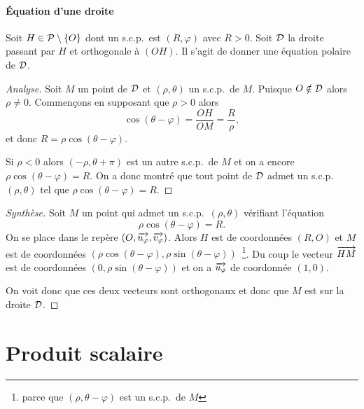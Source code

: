 \paragraph{Équation d'une droite}
\label{par:eqdroite}
Soit $H \in \P\setminus\{O\}$ dont un s.c.p.\ est $(R,\varphi)$ avec $R>0$. Soit $\Dr$ la droite passant par $H$ et orthogonale à $(OH)$. Il s'agit de donner une équation polaire de $\Dr$.
\begin{proof}[Analyse]
  Soit $M$ un point de $\Dr$ et $(\rho,\theta)$ un s.c.p.\ de $M$. Puisque $O \notin \Dr$ alors $\rho \neq 0$. Commençons en supposant que $\rho>0$ alors
  \begin{equation}
    \cos(\theta-\varphi)=\frac{OH}{OM}=\frac{R}{\rho},
  \end{equation}
  et donc $R=\rho \cos(\theta-\varphi)$. 

  Si $\rho<0$ alors $(-\rho,\theta+\pi)$ est un autre s.c.p.\ de $M$ et on a encore $\rho\cos(\theta-\varphi)=R$. On a donc montré que tout point de $\Dr$ admet un s.c.p.\ $(\rho, \theta)$ tel que $\rho\cos(\theta-\varphi)=R$.
\end{proof}
\begin{proof}[Synthèse]
Soit $M$ un point qui admet un s.c.p.\ $(\rho,\theta)$ vérifiant l'équation
\begin{equation}
  \rho\cos(\theta-\varphi)=R.
\end{equation}
On se place dans le repère $(O,\vect{u_\varphi}, \vect{v_\varphi})$. Alors $H$ est de coordonnées $(R,O)$ et $M$ est de coordonnées $(\rho\cos(\theta-\varphi), \rho\sin(\theta-\varphi))$~\footnote{parce que $(\rho, \theta-\varphi)$ est un s.c.p.\ de $M$}. Du coup le vecteur $\vect{HM}$ est de coordonnées $(0, \rho\sin(\theta-\varphi))$ et on a $\vect{u_\varphi}$ de coordonnée $(1,0)$. 

On voit donc que ces deux vecteurs sont orthogonaux et donc que $M$ est sur la droite $\Dr$.
\end{proof}

\section{Produit scalaire}
\label{sec:prodscalaire}
